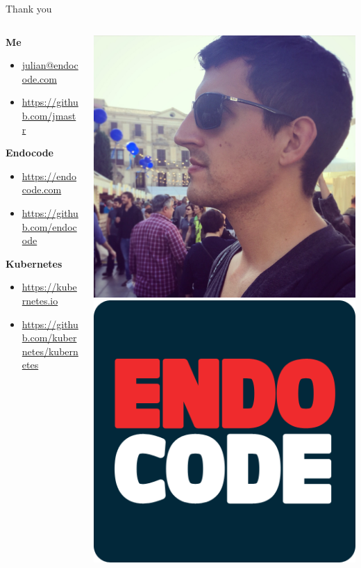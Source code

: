 \begin{frame} %
\centering\LARGE
Thank you
\end{frame}

\begin{frame} %
\begin{columns}[c] %
\begin{column}{.65\textwidth}
{\color{white}\Large
\textbf{Me}}
\begin{itemize}
\tightlist
\item
  \url{julian@endocode.com}
\item
  \url{https://github.com/jmastr}
\end{itemize}
{\color{white}\Large
\textbf{Endocode}}
\begin{itemize}
\tightlist
\item
  \url{https://endocode.com}
\item
  \url{https://github.com/endocode}
\end{itemize}
{\color{white}\Large
\textbf{Kubernetes}}
\begin{itemize}
\tightlist
\item
  \url{https://kubernetes.io}
\item
  \url{https://github.com/kubernetes/kubernetes}
\end{itemize}
\end{column}
\hfill
\begin{column}{.35\textwidth}
\includegraphics[width=.5\textwidth]{author.jpg}\\
\includegraphics[width=.5\textwidth]{endocode.png}\\

\end{column}
\end{columns}
\end{frame}
